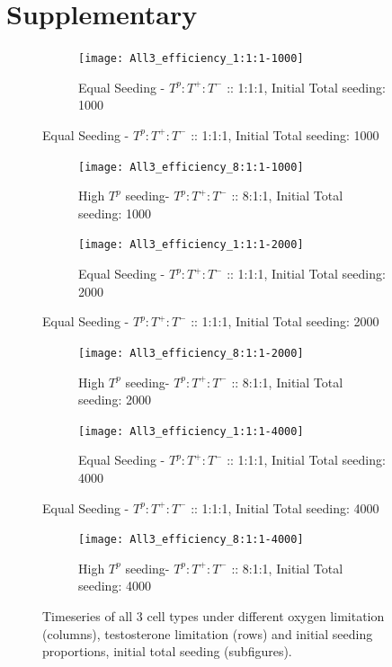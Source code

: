 \chapter*{Supplementary}

\begin{figure}[h!]
  \centering
  \begin{subfigure}[b]{\textwidth}
    \centering
    \texttt{[image: All3\_efficiency\_1:1:1-1000]}
    \caption{Equal Seeding - $T^p:T^+:T^-$ :: 1:1:1, Initial Total seeding: 1000}
    \label{fig_all3-time-series_1:1:1-1000}
  \end{subfigure}
\end{figure}
\begin{figure}[h!]\ContinuedFloat
  \centering
  \begin{subfigure}[b]{\textwidth}
    \centering
    \texttt{[image: All3\_efficiency\_8:1:1-1000]}
    \caption{High $T^p$ seeding- $T^p:T^+:T^-$ :: 8:1:1, Initial Total seeding: 1000}
    \label{fig_all3-time-series_8:1:1-1000}
  \end{subfigure}
  \begin{subfigure}[b]{\textwidth}
    \centering
    \texttt{[image: All3\_efficiency\_1:1:1-2000]}
    \caption{Equal Seeding - $T^p:T^+:T^-$ :: 1:1:1, Initial Total seeding: 2000}
    \label{fig_all3-time-series_1:1:1-2000}
  \end{subfigure}
\end{figure}
\begin{figure}[h!]\ContinuedFloat
  \centering
  \begin{subfigure}[b]{\textwidth}
    \centering
    \texttt{[image: All3\_efficiency\_8:1:1-2000]}
    \caption{High $T^p$ seeding- $T^p:T^+:T^-$ :: 8:1:1, Initial Total seeding: 2000}
    \label{fig_all3-time-series_8:1:1-2000}
  \end{subfigure}
  \begin{subfigure}[b]{\textwidth}
    \centering
    \texttt{[image: All3\_efficiency\_1:1:1-4000]}
    \caption{Equal Seeding - $T^p:T^+:T^-$ :: 1:1:1, Initial Total seeding: 4000}
    \label{fig_all3-time-series_1:1:1-4000}
  \end{subfigure}
\end{figure}
\begin{figure}[h!]\ContinuedFloat
  \centering
  \begin{subfigure}[b]{\textwidth}
    \centering
    \texttt{[image: All3\_efficiency\_8:1:1-4000]}
    \caption{High $T^p$ seeding- $T^p:T^+:T^-$ :: 8:1:1, Initial Total seeding: 4000}
    \label{fig_all3-time-series_8:1:1-4000}
  \end{subfigure}
  \caption[Timeseries of all 3 cell types under different limitations]{Timeseries of all 3 cell types under different oxygen limitation (columns), testosterone limitation (rows) and initial seeding proportions, initial total seeding (subfigures).}
  \label{fig_all3-time-series}
\end{figure}

